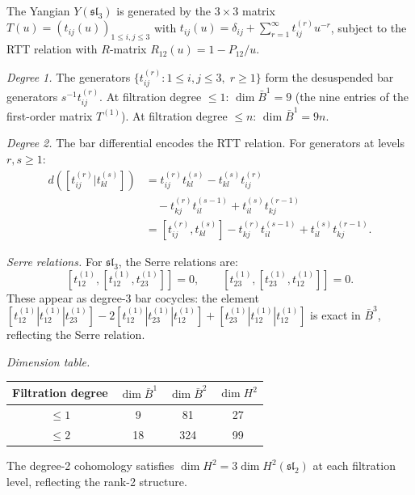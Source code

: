 \begin{computation}
\label{comp:yangian-sl3-bar}

The Yangian $Y(\mathfrak{sl}_3)$ is generated by the $3 \times 3$
matrix $T(u) = (t_{ij}(u))_{1 \leq i,j \leq 3}$ with
$t_{ij}(u) = \delta_{ij} + \sum_{r=1}^\infty t_{ij}^{(r)} u^{-r}$,
subject to the RTT relation with $R$-matrix
$R_{12}(u) = 1 - P_{12}/u$.

\emph{Degree 1.}
The generators $\{t_{ij}^{(r)} : 1 \leq i,j \leq 3, \; r \geq 1\}$
form the desuspended bar generators $s^{-1}t_{ij}^{(r)}$.
At filtration degree $\leq 1$: $\dim \bar{B}^1 = 9$
(the nine entries of the first-order matrix $T^{(1)}$).
At filtration degree $\leq n$: $\dim \bar{B}^1 = 9n$.

\emph{Degree 2.}
The bar differential encodes the RTT relation.
For generators at levels $r, s \geq 1$:
\begin{align*}
d([t_{ij}^{(r)} | t_{kl}^{(s)}])
&= t_{ij}^{(r)} t_{kl}^{(s)} - t_{kl}^{(s)} t_{ij}^{(r)} \\
&\quad - t_{kj}^{(r)} t_{il}^{(s-1)} + t_{il}^{(s)} t_{kj}^{(r-1)} \\
&= [t_{ij}^{(r)}, t_{kl}^{(s)}]
- t_{kj}^{(r)} t_{il}^{(s-1)} + t_{il}^{(s)} t_{kj}^{(r-1)}.
\end{align*}

\emph{Serre relations.}
For $\mathfrak{sl}_3$, the Serre relations are:
\[
[t_{12}^{(1)}, [t_{12}^{(1)}, t_{23}^{(1)}]] = 0, \qquad
[t_{23}^{(1)}, [t_{23}^{(1)}, t_{12}^{(1)}]] = 0.
\]
These appear as degree-3 bar cocycles: the element
$[t_{12}^{(1)} | t_{12}^{(1)} | t_{23}^{(1)}]
- 2[t_{12}^{(1)} | t_{23}^{(1)} | t_{12}^{(1)}]
+ [t_{23}^{(1)} | t_{12}^{(1)} | t_{12}^{(1)}]$
is exact in $\bar{B}^3$, reflecting the Serre relation.

\emph{Dimension table.}
\begin{center}
\renewcommand{\arraystretch}{1.2}
\begin{tabular}{c|ccc}
Filtration degree & $\dim \bar{B}^1$ & $\dim \bar{B}^2$ &
$\dim H^2$ \\
\hline
$\leq 1$ & 9 & 81 & 27 \\
$\leq 2$ & 18 & 324 & 99
\end{tabular}
\end{center}
The degree-2 cohomology satisfies $\dim H^2 = 3 \dim H^2(\mathfrak{sl}_2)$
at each filtration level, reflecting the rank-2 structure.
\end{computation}

